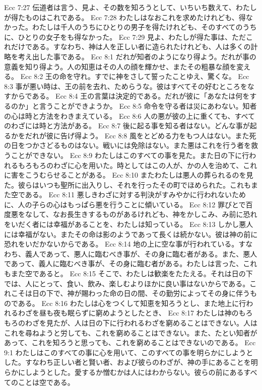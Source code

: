 Ecc 7:27  伝道者は言う、見よ、その数を知ろうとして、いちいち数えて、わたしが得たものはこれである。
Ecc 7:28  わたしはなおこれを求めたけれども、得なかった。わたしは千人のうちにひとりの男子を得たけれども、そのすべてのうちに、ひとりの女子をも得なかった。
Ecc 7:29  見よ、わたしが得た事は、ただこれだけである。すなわち、神は人を正しい者に造られたけれども、人は多くの計略を考え出した事である。
Ecc 8:1  だれが知者のようになり得よう。だれが事の意義を知り得よう。人の知恵はその人の顔を輝かせ、またその粗暴な顔を変える。
Ecc 8:2  王の命を守れ。すでに神をさして誓ったことゆえ、驚くな。
Ecc 8:3  事が悪い時は、王の前を去れ、ためらうな。彼はすべてその好むところをなすからである。
Ecc 8:4  王の言葉は決定的である。だれが彼に「あなたは何をするのか」と言うことができようか。
Ecc 8:5  命令を守る者は災にあわない。知者の心は時と方法をわきまえている。
Ecc 8:6  人の悪が彼の上に重くても、すべてのわざには時と方法がある。
Ecc 8:7  後に起る事を知る者はない。どんな事が起るかをだれが彼に告げ得よう。
Ecc 8:8  風をとどめる力をもつ人はない。また死の日をつかさどるものはない。戦いには免除はない。また悪はこれを行う者を救うことができない。
Ecc 8:9  わたしはこのすべての事を見た。また日の下に行われるもろもろのわざに心を用いた。時としてはこの人が、かの人を治めて、これに害をこうむらせることがある。
Ecc 8:10  またわたしは悪人の葬られるのを見た。彼らはいつも聖所に出入りし、それを行ったその町でほめられた。これもまた空である。
Ecc 8:11  悪しきわざに対する判決がすみやかに行われないために、人の子らの心はもっぱら悪を行うことに傾いている。
Ecc 8:12  罪びとで百度悪をなして、なお長生きするものがあるけれども、神をかしこみ、み前に恐れをいだく者には幸福があることを、わたしは知っている。
Ecc 8:13  しかし悪人には幸福がない。またその命は影のようであって長くは続かない。彼は神の前に恐れをいだかないからである。
Ecc 8:14  地の上に空な事が行われている。すなわち、義人であって、悪人に臨むべき事が、その身に臨む者がある。また、悪人であって、義人に臨むべき事が、その身に臨む者がある。わたしは言った、これもまた空であると。
Ecc 8:15  そこで、わたしは歓楽をたたえる。それは日の下では、人にとって、食い、飲み、楽しむよりほかに良い事はないからである。これこそは日の下で、神が賜わった命の日の間、その勤労によってその身に伴うものである。
Ecc 8:16  わたしは心をつくして知恵を知ろうとし、また地上に行われるわざを昼も夜も眠らずに窮めようとしたとき、
Ecc 8:17  わたしは神のもろもろのわざを見たが、人は日の下に行われるわざを窮めることはできない。人はこれを尋ねようと労しても、これを窮めることはできない。また、たとい知者があって、これを知ろうと思っても、これを窮めることはできないのである。
Ecc 9:1  わたしはこのすべての事に心を用いて、このすべての事を明らかにしようとした。すなわち正しい者と賢い者、および彼らのわざが、神の手にあることを明らかにしようとした。愛するか憎むかは人にはわからない。彼らの前にあるすべてのことは空である。
